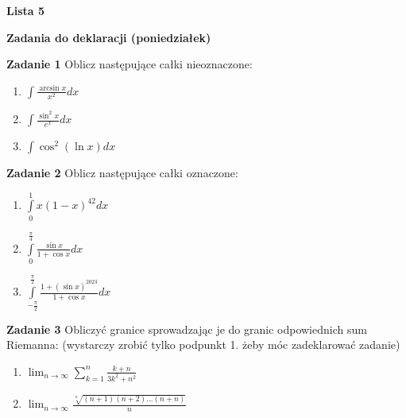 \documentclass[a4paper,11pt]{article}
\begin{document}
\begin{center}
  {\large\textbf{Lista 5}}
\end{center}

\hrulefill
\begin{center}
    \textbf{Zadania do deklaracji (poniedziałek)}
\end{center}

\bigskip

\textbf{Zadanie 1} Oblicz następujące całki nieoznaczone:

\begin{multicols}{3}
    \begin{enumerate}
        \item $\int \frac{\arcsin x}{x^2} dx$
        \item $\int \frac{\sin^2 x}{e^x}dx$
        \item $\int \cos^2(\ln x)dx$
    \end{enumerate}
\end{multicols}

\bigskip

\textbf{Zadanie 2} Oblicz następujące całki oznaczone:

\begin{multicols}{3}
    \begin{enumerate}
        \item $\int \limits_0^1 x(1-x)^{42} dx$
        \item $\int \limits_0^{\frac{\pi}{4}} \frac{\sin x}{1+\cos x}dx$
        \item $\int \limits_{-\frac{\pi}{2}}^{\frac{\pi}{2}} 
            \frac{1+(\sin x)^{2023}}{1+\cos x} dx$
    \end{enumerate}
\end{multicols}

\bigskip

\textbf{Zadanie 3} Obliczyć granice sprowadzając je do granic
odpowiednich sum Riemanna: (wystarczy zrobić tylko podpunkt 1. żeby móc
zadeklarować zadanie)

\begin{multicols}{2}
    \begin{enumerate}
        \item $ \lim_{n\to \infty} \sum_{k=1}^n \frac{k+n}{3k^2 + n^2}$
        \item $\lim_{n \to  \infty} \frac{\sqrt[n]{(n+1)(n+2)\ldots(n+n)}
            }{n}$
    \end{enumerate}
\end{multicols}
\end{document}
